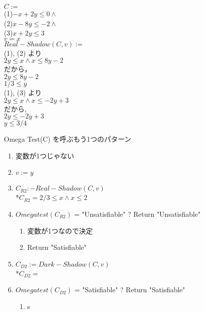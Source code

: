 \begin{center}
    $C :=$\\
    (1)$-x + 2y \leq 0 \wedge$\\ 
    (2)$x -8y \leq -2 \wedge$\\
    (3)$x + 2y \leq 3 $\\
    $v = x$\\
    $Real-Shadow(C,v) :=$\\
    (1), (2) より \\
    $2y \leq x \wedge x \leq 8y -2$\\
    だから，\\
    $2y \leq 8y -2$\\
    $1/3 \leq y$\\
    (1), (3) より \\
    $2y \leq x \wedge x \leq -2y +3$\\
    だから, \\
    $2y \leq -2y + 3$\\
    $y \leq 3/4$
\end{center}

Omega Test(C) を呼ぶもう1つのパターン
\begin{enumerate}
    \item 変数が1つじゃない
    \item $v := y$
    \item $C_{R2} :- Real-Shadow(C,v)$\\
            *$C_{R2} = 2/3 \leq x \wedge x \leq 2$
    \item $Omegatest(C_{R2})$ = "Unsatisfiable" ? Return "Unsatisfiable"
    \begin{enumerate}
        \item 変数が1つなので決定
        \item Return "Satisfiable"
    \end{enumerate}
    \item $C_{D2} := Dark-Shadow(C,v)$\\
            *$C_{D2} = $
    \item $Omegatest(C_{D2})$ = "Satisfiable" ? Return "Satisfiable"
    \begin{enumerate}
        \item s
    \end{enumerate}
\end{enumerate}